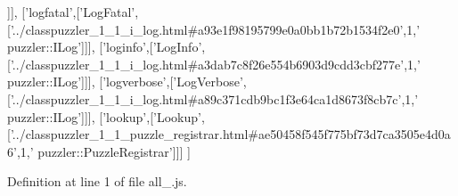 \begin{DoxyCode}
  [\textcolor{stringliteral}{'logerror'},[\textcolor{stringliteral}{'LogError'},[\textcolor{stringliteral}{'../classpuzzler\_1\_1\_i\_log.html#a7f67c099561fcdb77ead03b82e228e0e'},1,\textcolor{stringliteral}{'
      puzzler::ILog'}]]],
  [\textcolor{stringliteral}{'logfatal'},[\textcolor{stringliteral}{'LogFatal'},[\textcolor{stringliteral}{'../classpuzzler\_1\_1\_i\_log.html#a93e1f98195799e0a0bb1b72b1534f2e0'},1,\textcolor{stringliteral}{'
      puzzler::ILog'}]]],
  [\textcolor{stringliteral}{'loginfo'},[\textcolor{stringliteral}{'LogInfo'},[\textcolor{stringliteral}{'../classpuzzler\_1\_1\_i\_log.html#a3dab7c8f26e554b6903d9cdd3cbf277e'},1,\textcolor{stringliteral}{'
      puzzler::ILog'}]]],
  [\textcolor{stringliteral}{'logverbose'},[\textcolor{stringliteral}{'LogVerbose'},[\textcolor{stringliteral}{'../classpuzzler\_1\_1\_i\_log.html#a89c371cdb9bc1f3e64ca1d8673f8cb7c'},1,\textcolor{stringliteral}{'
      puzzler::ILog'}]]],
  [\textcolor{stringliteral}{'lookup'},[\textcolor{stringliteral}{'Lookup'},[\textcolor{stringliteral}{'../classpuzzler\_1\_1\_puzzle\_registrar.html#ae50458f545f775bf73d7ca3505e4d0a6'},1,\textcolor{stringliteral}{'
      puzzler::PuzzleRegistrar'}]]]
]
\end{DoxyCode}


Definition at line 1 of file all\+\_.\+js.

